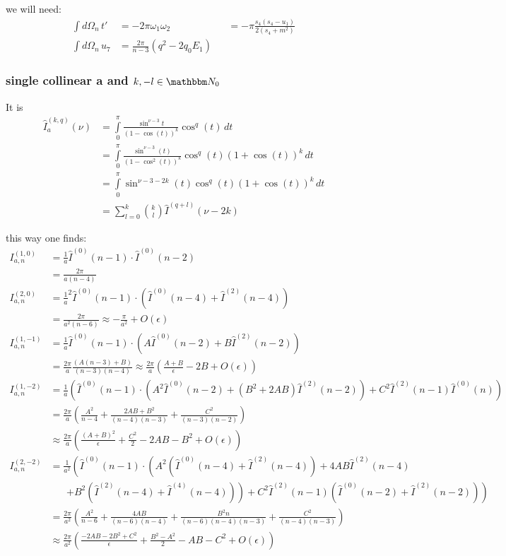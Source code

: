 \documentclass[
  english,		%
  a4paper,		%
  11pt,			%
  DIV=12,
  titlepage,
  toc=bibnumbered,
  parskip=full,  	%
  headings=normal,
  BCOR=12mm,
  numbers=noenddot
]{scrartcl}
\begin{document}
we will need:
\begin{align}
\int\!d\Omega_n\,t' &= -2\pi \omega_1\omega_2 &&= -\pi\frac{s_4(s_4-u_1)}{2(s_4+m^2)}\\
\int\!d\Omega_n\,u_7 &= \frac{2\pi}{n-3}(q^2-2q_0E_1)
\end{align}

\subsubsection{single collinear a and $k,-l\in \mathbbm N_0$}
It is
\begin{align}
\hat I_{a}^{(k,q)}(\nu) &= \int\limits_0^\pi\!\frac{\sin^{\nu-3}t}{(1-\cos(t))^k}\cos^q(t)\, dt \\
 &= \int\limits_0^\pi\!\frac{\sin^{\nu-3}(t)}{(1-\cos^2(t))^k}\cos^q(t)(1+\cos(t))^k\, dt\\
 &=\int\limits_0^\pi\!\sin^{\nu-3-2k}(t)\cos^q(t)(1+\cos(t))^k\, dt\\
 &= \sum\limits_{l=0}^k\binom{k}{l}\hat I^{(q+l)}(\nu-2k)
\end{align}

this way one finds\cite[Ch. 5]{Bojak:2000eu}\cite[App. C]{PhysRevD.40.54}:
\begin{align}
I^{(1,0)}_{a,n} &= \frac 1 a\hat I^{(0)}(n-1) \cdot \hat I^{(0)}(n-2)\\
 &= \frac {2\pi}{a(n-4)}\\
I^{(2,0)}_{a,n} &= \frac 1 a^2\hat I^{(0)}(n-1) \cdot \left(\hat I^{(0)}(n-4) + \hat I^{(2)}(n-4)\right)\\
 &= \frac {2\pi}{a^2(n-6)} \approx -\frac {\pi}{a^2} + O(\epsilon)\\
I^{(1,-1)}_{a,n} &= \frac 1 a\hat I^{(0)}(n-1)\cdot \left(A\hat I^{(0)}(n-2)+B\hat I^{(2)}(n-2)\right)\\
 &= \frac {2\pi}{a}\frac{(A(n-3)+B)}{(n-3)(n-4)} \approx \frac {2\pi}{a}\left(\frac{A+B}\epsilon - 2B + O(\epsilon)\right)\\
I^{(1,-2)}_{a,n} &= \frac 1 a\left(\hat I^{(0)}(n-1)\cdot \left(A^2\hat I^{(0)}(n-2)+(B^2+2AB)\hat I^{(2)}(n-2)\right) + C^2\hat I^{(2)}(n-1)\hat I^{(0)}(n)\right)\\
 &= \frac {2\pi}{a}\left(\frac {A^2}{n-4} + \frac {2AB + B^2}{(n-4)(n-3)} + \frac {C^2}{(n-3)(n-2)}\right) \\
 &\approx \frac {2\pi}{a}\left(\frac{(A+B)^2}{\epsilon}+\frac{C^2}{2}-2AB-B^2+O(\epsilon)\right)\\
I^{(2,-2)}_{a,n} &= \frac 1 {a^2}\left(\hat I^{(0)}(n-1)\cdot \left(A^2(\hat I^{(0)}(n-4)+\hat I^{(2)}(n-4))+4AB\hat I^{(2)}(n-4) \right.\right.\nonumber\\
 &\hspace{20pt}\left.\left. + B^2(\hat I^{(2)}(n-4)+\hat I^{(4)}(n-4))\right) + C^2\hat I^{(2)}(n-1)(\hat I^{(0)}(n-2) + \hat I^{(2)}(n-2))\right)\\
 &= \frac {2\pi}{a^2}\left(\frac {A^2}{n-6}+\frac{4AB}{(n-6)(n-4)} + \frac{B^2 n}{(n-6)(n-4)(n-3)} + \frac{C^2}{(n-4)(n-3)} \right) \\
 &\approx \frac {2\pi}{a^2}\left(\frac{-2AB-2B^2+C^2}{\epsilon}+\frac{B^2-A^2}{2}-AB-C^2+O(\epsilon)\right)\\
\end{align}
\end{document}
